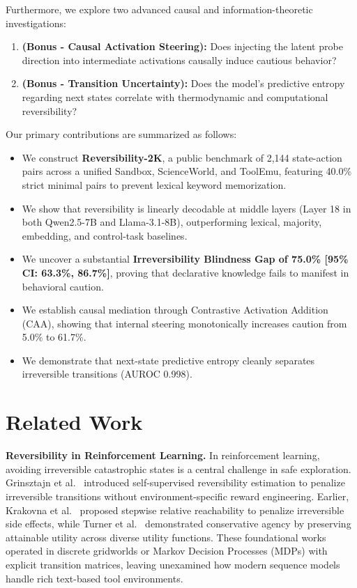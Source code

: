 \documentclass[10pt,twocolumn,letterpaper]{article}
\begin{document}
Furthermore, we explore two advanced causal and information-theoretic investigations:
\begin{enumerate}
    \item[\textbf{RQ4}] \textbf{(Bonus - Causal Activation Steering):} Does injecting the latent probe direction into intermediate activations causally induce cautious behavior?
    \item[\textbf{RQ5}] \textbf{(Bonus - Transition Uncertainty):} Does the model's predictive entropy regarding next states correlate with thermodynamic and computational reversibility?
\end{enumerate}

Our primary contributions are summarized as follows:
\begin{itemize}
    \item We construct \textbf{Reversibility-2K}, a public benchmark of 2,144 state-action pairs across a unified Sandbox, ScienceWorld, and ToolEmu, featuring 40.0\% strict minimal pairs to prevent lexical keyword memorization.
    \item We show that reversibility is linearly decodable at middle layers (Layer 18 in both Qwen2.5-7B and Llama-3.1-8B), outperforming lexical, majority, embedding, and control-task baselines.
    \item We uncover a substantial \textbf{Irreversibility Blindness Gap of 75.0\% [95\% CI: 63.3\%, 86.7\%]}, proving that declarative knowledge fails to manifest in behavioral caution.
    \item We establish causal mediation through Contrastive Activation Addition (CAA), showing that internal steering monotonically increases caution from 5.0\% to 61.7\%.
    \item We demonstrate that next-state predictive entropy cleanly separates irreversible transitions (AUROC 0.998).
\end{itemize}

\section{Related Work}
\textbf{Reversibility in Reinforcement Learning.} In reinforcement learning, avoiding irreversible catastrophic states is a central challenge in safe exploration. Grinsztajn et al.~\cite{grinsztajn2021there} introduced self-supervised reversibility estimation to penalize irreversible transitions without environment-specific reward engineering. Earlier, Krakovna et al.~\cite{krakovna2018penalizing} proposed stepwise relative reachability to penalize irreversible side effects, while Turner et al.~\cite{turner2020conservative} demonstrated conservative agency by preserving attainable utility across diverse utility functions. These foundational works operated in discrete gridworlds or Markov Decision Processes (MDPs) with explicit transition matrices, leaving unexamined how modern sequence models handle rich text-based tool environments.
\end{document}
